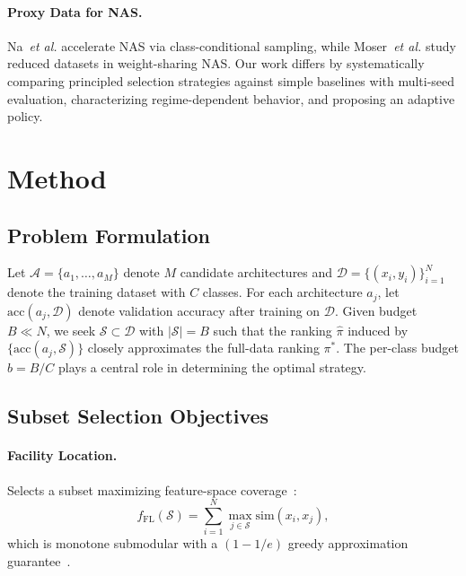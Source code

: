 \documentclass{cvpr}
\providecommand{\etal}{\textit{et al.}\xspace}
\begin{document}
\paragraph{Proxy Data for NAS.}
Na~\etal\cite{na2021accelerating} accelerate NAS via class-conditional sampling, while Moser~\etal\cite{moser2022less} study reduced datasets in weight-sharing NAS. Our work differs by systematically comparing principled selection strategies against simple baselines with multi-seed evaluation, characterizing regime-dependent behavior, and proposing an adaptive policy.

\section{Method}
\label{sec:method}

\subsection{Problem Formulation}

Let $\mathcal{A} = \{a_1, \ldots, a_M\}$ denote $M$ candidate architectures and $\mathcal{D} = \{(x_i, y_i)\}_{i=1}^{N}$ denote the training dataset with $C$ classes. For each architecture $a_j$, let $\text{acc}(a_j, \mathcal{D})$ denote validation accuracy after training on $\mathcal{D}$. Given budget $B \ll N$, we seek $\mathcal{S} \subset \mathcal{D}$ with $|\mathcal{S}| = B$ such that the ranking $\hat{\pi}$ induced by $\{\text{acc}(a_j, \mathcal{S})\}$ closely approximates the full-data ranking $\pi^*$. The per-class budget $b = B/C$ plays a central role in determining the optimal strategy.

\subsection{Subset Selection Objectives}

\paragraph{Facility Location.}
Selects a subset maximizing feature-space coverage~\cite{wei2015submodularity}:
\begin{equation}
    f_{\text{FL}}(\mathcal{S}) = \sum_{i=1}^{N} \max_{j \in \mathcal{S}} \text{sim}(x_i, x_j),
    \label{eq:fl}
\end{equation}
which is monotone submodular with a $(1 - 1/e)$ greedy approximation guarantee~\cite{nemhauser1978analysis}.
\end{document}
